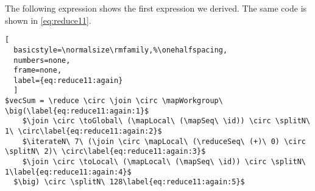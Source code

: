 The following expression shows the first expression we derived.
The same code is shown in \autoref{eq:reduce11}.
\begin{lstlisting}[
  basicstyle=\normalsize\rmfamily,%\onehalfspacing,
  numbers=none,
  frame=none,
  label={eq:reduce11:again}
  ]
$vecSum = \reduce \circ \join \circ \mapWorkgroup\ \big(\label{eq:reduce11:again:1}$
    $\join \circ \toGlobal\ (\mapLocal\ (\mapSeq\ \id)) \circ \splitN\ 1\ \circ\label{eq:reduce11:again:2}$
    $\iterateN\ 7\ (\join \circ \mapLocal\ (\reduceSeq\ (+)\ 0) \circ \splitN\ 2)\ \circ\label{eq:reduce11:again:3}$
    $\join \circ \toLocal\ (\mapLocal\ (\mapSeq\ \id)) \circ \splitN\ 1\label{eq:reduce11:again:4}$
  $\big) \circ \splitN\ 128\label{eq:reduce11:again:5}$
\end{lstlisting}

